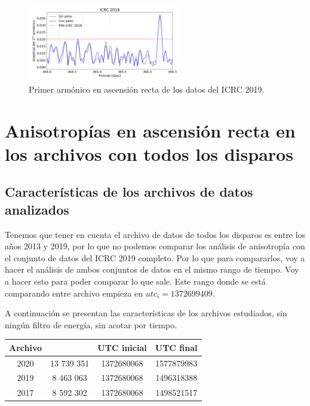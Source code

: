 			\begin{figure}[H]
				\centering
				\includegraphics[width=0.6\textwidth]{../Anisotropia/ICRC/ICRC2019_Eraw_Eraw_hex.png}
				\caption{Primer armónico en ascensión recta de los datos del ICRC 2019.} \label{fig:8EeV_con_peso_ICRC2019}
			\end{figure}


			
	\section{Anisotropías en ascensión recta en los archivos con todos los disparos}
		\subsection{Características de los archivos de datos analizados}

			Tenemos que tener en cuenta el archivo de datos de todos los disparos es entre los años 2013 y 2019, por lo que no podemos comparar los análisis de anisotropía con el conjunto  de datos del ICRC 2019 completo. Por lo que para compararlos, voy a hacer el análisis de ambos conjuntos de datos en el mismo rango de tiempo. Voy a hacer esto para poder comparar lo que sale. 			Este rango donde se está comparando entre archivo empieza en  $utc_i = 1372699409 $.


			A continuación se presentan las características de los archivos estudiados, sin ningún filtro de energía, sin acotar por tiempo. 

			\begin{table}[H]
			\centering
				\begin{tabular}{c|c|c|c}
				\textbf{Archivo} & \text{Eventos} & UTC inicial &  UTC final  \\ \hline
				2020			 & 13 739 351	  &  1372680068	&  1577879983 \\
				2019			 & 	8 463 063	  &	 1372680068 &  1496318388 \\
				2017			 &	8 592 302	  &  1372680068 &  1498521517 \\
					\end{tabular}
			\end{table}
			
